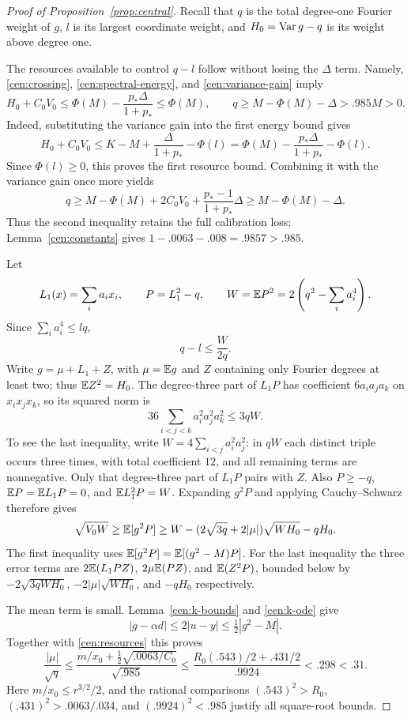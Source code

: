 \begin{proof}[Proof of Proposition~\ref{prop:central}]
Recall that $q$ is the total degree-one Fourier weight of $g$, $l$ is
its largest coordinate weight, and $H_0=\operatorname{Var} g-q$ is its weight above
degree one.

The resources available to control $q-l$ follow without losing the
$\Delta$ term.  Namely, \eqref{cen:crossing},
\eqref{cen:spectral-energy}, and \eqref{cen:variance-gain} imply
\begin{equation}\label{cen:resources}
 H_0+C_0V_0\le\Phi(M)-\frac{p_*\Delta}{1+p_*}\le\Phi(M),
 \qquad
 q\ge M-\Phi(M)-\Delta>.985M>0.
\end{equation}
Indeed, substituting the variance gain into the first energy bound gives
\[
 H_0+C_0V_0\le K-M+\frac{\Delta}{1+p_*}-\Phi(l)
 =\Phi(M)-\frac{p_*\Delta}{1+p_*}-\Phi(l).
\]
Since $\Phi(l)\ge0$, this proves the first resource bound. Combining it
with the variance gain once more yields
\[
 q\ge M-\Phi(M)+2C_0V_0+\frac{p_*-1}{1+p_*}\Delta
 \ge M-\Phi(M)-\Delta.
\]
Thus the second inequality retains the full calibration loss;
Lemma~\ref{cen:constants} gives
$1-.0063-.008=.9857>.985$.

Let
\[
 L_1(x)=\sum_i a_i x_i,\qquad P=L_1^2-q,\qquad
 W=\mathbb E P^2=2\left(q^2-\sum_i a_i^4\right).
\]
Since $\sum_i a_i^4\le lq$,
\begin{equation}\label{cen:spread}
 q-l\le\frac W{2q}.
\end{equation}
Write $g=\mu+L_1+Z$, with $\mu=\mathbb E g$ and $Z$ containing only Fourier
degrees at least two; thus $\mathbb E Z^2=H_0$.
The degree-three part of $L_1P$ has coefficient $6a_i a_j a_k$ on
$x_ix_jx_k$, so its squared norm is
\[
 36\sum_{i<j<k}a_i^2a_j^2a_k^2\le3qW.
\]
To see the last inequality, write $W=4\sum_{i<j}a_i^2a_j^2$:
in $qW$ each distinct triple occurs three times, with total coefficient
$12$, and all remaining terms are nonnegative.
Only that degree-three part of $L_1P$ pairs with $Z$.
Also $P\ge-q$, $\mathbb E P=\mathbb E L_1P=0$, and $\mathbb E L_1^2P=W$.
Expanding $g^2P$ and applying Cauchy--Schwarz therefore gives
\begin{equation}\label{cen:quadratic}
 \sqrt{V_0W}\ge\mathbb E[g^2P]
 \ge W-(2\sqrt{3q}+2|\mu|)\sqrt{WH_0}-qH_0.
\end{equation}
The first inequality uses $\mathbb E[g^2P]=\mathbb E[(g^2-M)P]$.
For the last inequality the three error terms are
$2\mathbb E(L_1PZ)$, $2\mu\mathbb E(PZ)$, and $\mathbb E(Z^2P)$, bounded below by
$-2\sqrt{3qWH_0}$, $-2|\mu|\sqrt{WH_0}$, and $-qH_0$ respectively.

The mean term is small.  Lemma~\ref{cen:k-bounds} and
\eqref{cen:k-ode} give
\[
 |g-\alpha d|\le2|u-y|\le\tfrac12|g^2-M|.
\]
Together with \eqref{cen:resources} this proves
\begin{equation}\label{cen:mean-bound}
 \frac{|\mu|}{\sqrt q}
 \le\frac{m/x_0+\tfrac12\sqrt{.0063/C_0}}{\sqrt{.985}}
 \le\frac{R_0(.543)/2+.431/2}{.9924}<.298<.31.
\end{equation}
Here $m/x_0\le r^{3/2}/2$, and the rational comparisons
$(.543)^2>R_0$, $(.431)^2>.0063/.034$, and
$(.9924)^2<.985$ justify all square-root bounds.


\end{proof}
